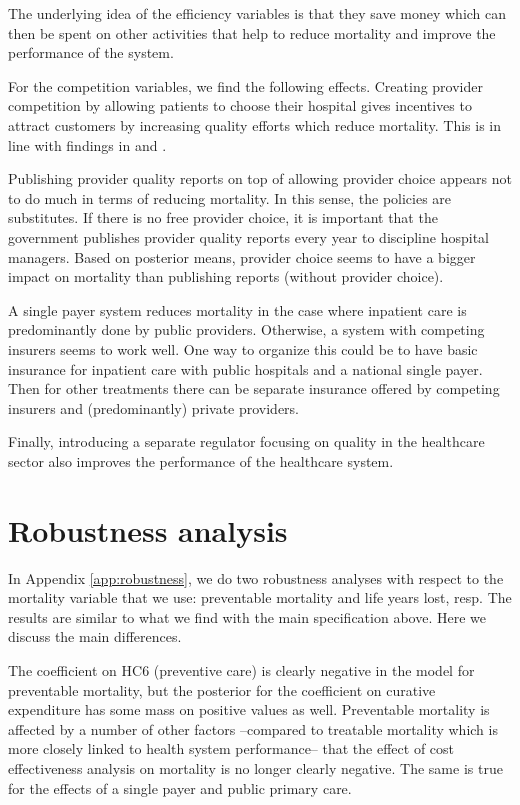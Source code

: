\documentclass[12pt,english,a4paper]{article}
\begin{document}
The underlying idea of the efficiency variables is that they save money which can then be spent on other activities that help to reduce mortality and improve the performance of the system.

For the competition variables, we find the following effects. Creating provider competition by allowing patients to choose their hospital gives incentives to attract customers by increasing quality efforts which reduce mortality. This is in line with findings in \cite{NBERw19800} and \cite{teisberg}.

Publishing provider quality reports on top of allowing provider choice appears not to do much in terms of reducing mortality. In this sense, the policies are substitutes. If there is no free provider choice, it is important that the government publishes provider quality reports every year to discipline hospital managers. Based on posterior means, provider choice seems to have a bigger impact on mortality than publishing reports (without provider choice).

A single payer system reduces mortality in the case where inpatient care is predominantly done by public providers. Otherwise, a system with competing insurers seems to work well. One way to organize this could be to have basic insurance for inpatient care with public hospitals and a national single payer. Then for other treatments there can be separate insurance offered by competing insurers and (predominantly) private providers.

Finally, introducing a separate regulator focusing on quality in the healthcare sector also improves the performance of the healthcare system.

\section{Robustness analysis}
\label{sec:org6cb06c3}

In Appendix \ref{app:robustness}, we do two robustness analyses with respect to the mortality variable that we use: preventable mortality and  life years lost, resp. The results are similar to what we find with the main specification above. Here we discuss the main differences.

The coefficient on HC6 (preventive care) is clearly negative in the model for preventable mortality, but the posterior for the coefficient on curative expenditure has some mass on positive values as well. Preventable mortality is affected by a number of other factors --compared to treatable mortality which is more closely linked to health system performance-- that the effect of cost effectiveness analysis on mortality is no longer clearly negative. The same is true for the effects of a single payer and public primary care.
\end{document}
